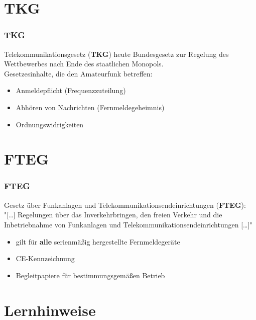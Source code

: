 \section{TKG}

\begin{frame}
    \frametitle{TKG}

    Telekommunikationsgesetz (\textbf{TKG}) heute Bundesgesetz zur Regelung des
    Wettbewerbes nach Ende des staatlichen Monopols. \\[1em]

    Gesetzesinhalte, die den Amateurfunk betreffen:

    \begin{itemize}
        \item Anmeldepflicht (Frequenzzuteilung)
        \item Abhören von Nachrichten (Fernmeldegeheimnis)
        \item Ordnungswidrigkeiten
    \end{itemize}

\end{frame}

\section{FTEG}

\begin{frame}
    \frametitle{FTEG}

     Gesetz über Funkanlagen und Telekommunikationsendeinrichtungen
     (\textbf{FTEG}): \\[2em]
     
     "[\ldots] Regelungen über das Inverkehrbringen, den freien Verkehr und die
     Inbetriebnahme von Funkanlagen und Telekommunikationsendeinrichtungen
     [\ldots]"

    \begin{itemize}
        \item gilt für \textbf{alle} serienmäßig hergestellte Fernmeldegeräte
        \item CE-Kennzeichnung
        \item Begleitpapiere für bestimmungsgemäßen Betrieb
    \end{itemize}

\end{frame}

\section{Lernhinweise}


